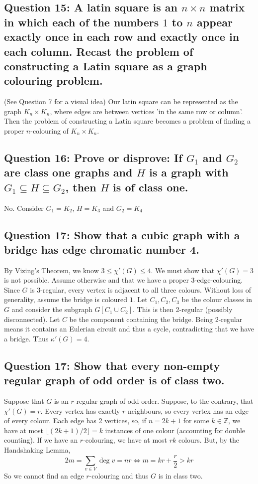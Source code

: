 \documentclass[letterpaper, 11pt]{article}
\newcommand{\1}{\mathds{1}}	%
\theoremstyle{definition}
\begin{document}
\subsection*{Question 15: A latin square is an $n \times n$ matrix in which each of the numbers $1$ to $n$ appear exactly once in each row and exactly once in each column. Recast the problem of constructing a Latin square as a graph colouring problem.}
(See Question 7 for a visual idea) Our latin square can be represented as the graph $K_{n} \times K_n$, where edges are between vertices 'in the same row or column'. Then the problem of constructing a Latin square becomes a problem of finding a proper $n$-colouring of $K_n \times K_n$.

\subsection*{Question 16: Prove or disprove: If $G_1$ and $G_2$ are class one graphs and $H$ is a graph with $G_1 \subseteq H \subseteq G_2$, then $H$ is of class one.}
No. Consider $G_1 = K_2$, $H = K_3$ and $G_2 = K_4$
\subsection*{Question 17: Show that a cubic graph with a bridge has edge chromatic number 4.}
By Vizing's Theorem, we know $3 \le \chi ' (G) \le 4$. We must show that $\chi ' (G) = 3$ is not possible. Assume otherwise and that we have a proper $3$-edge-colouring. Since $G$ is 3-regular, every vertex is adjacent to all three colours. Without loss of generality, assume the bridge is coloured $1$. Let $C_1, C_2, C_3$ be the colour classes in $G$ and consider the subgraph $G[C_1 \cup C_2]$. This is then 2-regular (possibly disconnected). Let $C$ be the component containing the bridge. Being 2-regular means it contains an Eulerian circuit and thus a cycle, contradicting that we have a bridge. Thus $\kappa ' (G) = 4$.

\subsection*{Question 17: Show that every non-empty regular graph of odd order is of class two.}
Suppose that $G$ is an $r$-regular graph of odd order. Suppose, to the contrary, that $\chi ' (G) = r$. Every vertex has exactly $r$ neighbours, so every vertex has an edge of every colour. Each edge has 2 vertices, so, if $n = 2k + 1$ for some $k \in \mathbb{Z}$, we have at most $\lfloor (2k + 1)/2 \rfloor = k$ instances of one colour (accounting for double counting). If we have an $r$-colouring, we have at most $rk$ colours. But, by the Handshaking Lemma, \[
2m = \sum \limits _{v \in V} \deg v = nr \iff m = kr + \frac{r}{2} > kr
\] 
So we cannot find an edge $r$-colouring and thus $G$ is in class two.
\end{document}
